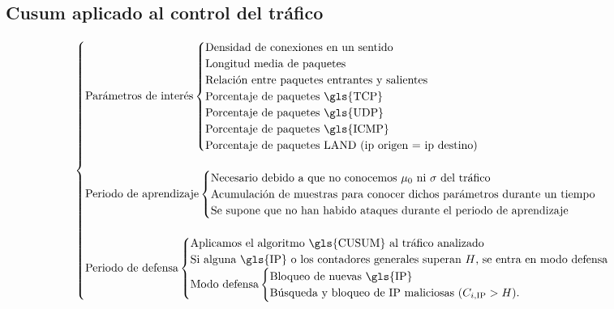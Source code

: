 \begin{Resumen}
\subsection*{Cusum aplicado al control del tráfico}
\begin{displaymath}
 \begin{cases}
  \text{Parámetros de interés}
  \begin{cases}
   \text{Densidad de conexiones en un sentido} \\
   \text{Longitud media de paquetes} \\
   \text{Relación entre paquetes entrantes y salientes} \\
   \text{Porcentaje de paquetes \gls{TCP}} \\
   \text{Porcentaje de paquetes \gls{UDP}} \\
   \text{Porcentaje de paquetes \gls{ICMP}} \\
   \text{Porcentaje de paquetes LAND (ip origen = ip destino)}
  \end{cases}\\\\
  \text{Periodo de aprendizaje}
  \begin{cases}
   \text{Necesario debido a que no conocemos $\mu_0$ ni $\sigma$ del tráfico} \\
   \text{Acumulación de muestras para conocer dichos parámetros durante un tiempo} \\
   \text{Se supone que no han habido ataques durante el periodo de aprendizaje}
  \end{cases}\\\\
  \text{Periodo de defensa}
  \begin{cases}
   \text{Aplicamos el algoritmo \gls{CUSUM} al tráfico analizado} \\
   \text{Si alguna \gls{IP} o los contadores generales superan $H$, se entra en modo defensa} \\
   \text{Modo defensa}
   \begin{cases}
    \text{Bloqueo de nuevas \gls{IP}} \\
    \text{Búsqueda y bloqueo de IP maliciosas ($C_{i,\text{IP}} > H$).}
   \end{cases}
  \end{cases} \\
 \end{cases}
\end{displaymath}


\end{Resumen}

